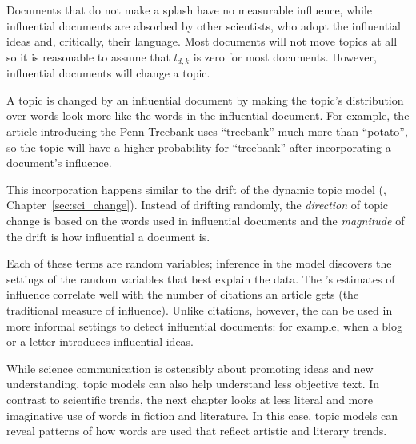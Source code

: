Documents that do not make a splash have no measurable influence, while influential
documents are absorbed by other scientists, who adopt the influential ideas and, critically, their language.  Most documents will not move topics
at all so it is reasonable to assume that $l_{d,k}$ is zero for most
documents.  However, influential documents will change a topic.

A topic is changed by an influential document by making the topic's
distribution over words look more like the words in the influential document.  For example, the article
introducing the Penn Treebank uses ``treebank'' much more than
``potato'', so the topic will have a higher probability for
``treebank'' after incorporating a document's influence.

This incorporation happens similar to the drift of the dynamic topic
model (, Chapter~\ref{sec:sci_change}).  Instead of drifting
randomly, the \emph{direction} of topic change is based on the words
used in influential documents and the \emph{magnitude} of the drift is
how influential a document is.

Each of these terms are random variables; inference in the model discovers the
settings of the random variables that best explain the data.  The 's
estimates of influence correlate well with the number of citations an article
gets (the traditional measure of influence).  Unlike citations, however, the
 can be used in more informal settings to detect influential
documents: for example, when a blog or a letter introduces influential
ideas.

While science communication is ostensibly about promoting ideas and new
understanding, topic models can also help understand less objective text.
In contrast to scientific trends, the next chapter looks at less literal and more imaginative use of words in fiction and literature.
In this case, topic models can reveal patterns of how words are used
that reflect artistic and literary trends.
